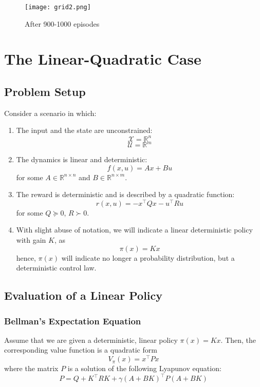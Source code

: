 \documentclass[openany]{book}
\theoremstyle{definition}
\theoremstyle{remark}
\begin{document}
\begin{figure}[ht]
    \centering
    \texttt{[image: grid2.png]}
    \caption{After 900-1000 episodes}
    \label{fig:grid2}
\end{figure}

\section{The Linear-Quadratic Case}
\subsection{Problem Setup}
Consider a scenario in which:
\begin{enumerate}
    \item The input and the state are unconstrained:
        \[
            \mathcal{X} = \mathbb{R}^n
        \]
        \[
            \mathcal{U} = \mathbb{R}^m
        \]
    
    \item The dynamics is linear and deterministic:
        \[
            f(x,u) = Ax + Bu
        \]
        for some $A \in \mathbb{R}^{n\times n}$ and $B \in \mathbb{R}^{n\times m}$.
    
    \item The reward is deterministic and is described by a quadratic function:
        \[
            r(x,u) = -x^\top Qx - u^\top Ru
        \]
        for some $Q \succeq 0$, $R \succ 0$.
    
    \item With slight abuse of notation, we will indicate a linear deterministic policy with gain $K$, as
        \[
            \pi(x) = Kx
        \]
        hence, $\pi(x)$ will indicate no longer a probability distribution, but a deterministic control law.
\end{enumerate}

\subsection{Evaluation of a Linear Policy}
\subsubsection{Bellman's Expectation Equation}
Assume that we are given a deterministic, linear policy $\pi(x) = Kx$. Then, the corresponding value function is a quadratic form
\[
    V_\pi(x) = x^\top Px
\]
where the matrix $P$ is a solution of the following Lyapunov equation:
\[
    P = Q + K^\top RK + \gamma(A + BK)^\top P(A + BK)
\]
\end{document}
